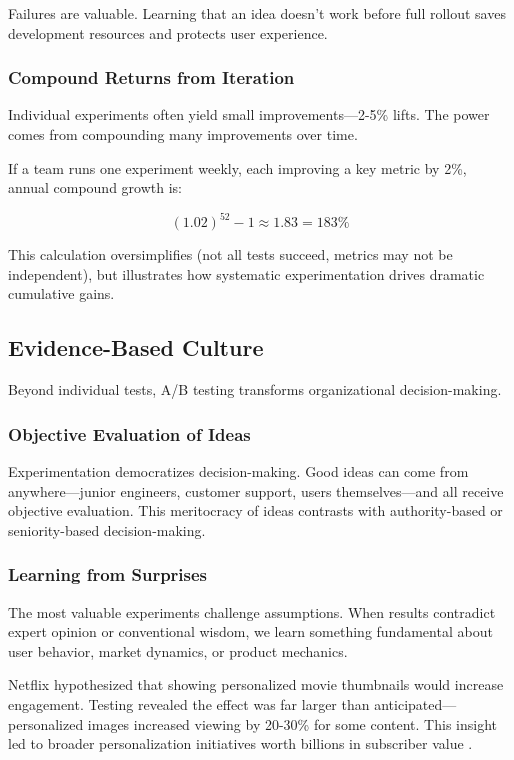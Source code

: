 Failures are valuable. Learning that an idea doesn't work before full rollout saves development resources and protects user experience.

\subsubsection{Compound Returns from Iteration}

Individual experiments often yield small improvements—2-5\% lifts. The power comes from compounding many improvements over time.

If a team runs one experiment weekly, each improving a key metric by 2\%, annual compound growth is:

\begin{equation}
(1.02)^{52} - 1 \approx 1.83 = 183\%
\end{equation}

This calculation oversimplifies (not all tests succeed, metrics may not be independent), but illustrates how systematic experimentation drives dramatic cumulative gains.

\subsection{Evidence-Based Culture}

Beyond individual tests, A/B testing transforms organizational decision-making.

\subsubsection{Objective Evaluation of Ideas}

Experimentation democratizes decision-making. Good ideas can come from anywhere—junior engineers, customer support, users themselves—and all receive objective evaluation. This meritocracy of ideas contrasts with authority-based or seniority-based decision-making.

\subsubsection{Learning from Surprises}

The most valuable experiments challenge assumptions. When results contradict expert opinion or conventional wisdom, we learn something fundamental about user behavior, market dynamics, or product mechanics.

\begin{example}
Netflix hypothesized that showing personalized movie thumbnails would increase engagement. Testing revealed the effect was far larger than anticipated—personalized images increased viewing by 20-30\% for some content. This insight led to broader personalization initiatives worth billions in subscriber value \citep{kohavi2020trustworthy}.
\end{example}

